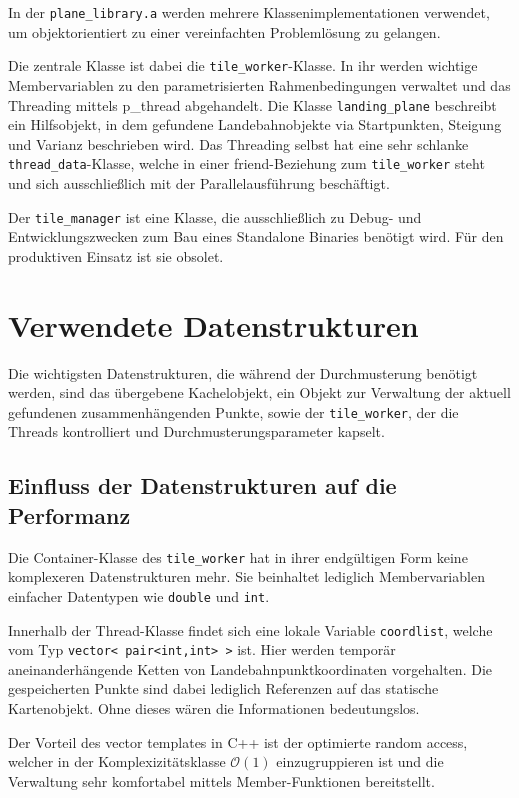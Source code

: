 \documentclass[10pt,a4paper]{report}
\begin{document}
In der \texttt{plane\_library.a} werden mehrere Klassenimplementationen verwendet, um objektorientiert zu einer vereinfachten Problemlösung zu gelangen.

Die zentrale Klasse ist dabei die \texttt{tile\_worker}-Klasse. In ihr werden wichtige Membervariablen zu den parametrisierten Rahmenbedingungen verwaltet und das Threading mittels p\_thread abgehandelt. Die Klasse \texttt{landing\_plane} beschreibt ein Hilfsobjekt, in dem gefundene Landebahnobjekte via Startpunkten, Steigung und Varianz beschrieben wird.
Das Threading selbst hat eine sehr schlanke \texttt{thread\_data}-Klasse, welche in einer \glqq friend\grqq -Beziehung zum \texttt{tile\_worker} steht und sich ausschließlich mit der Parallelausführung beschäftigt.

Der \texttt{tile\_manager} ist eine Klasse, die ausschließlich zu Debug- und Entwicklungszwecken zum Bau eines Standalone Binaries benötigt wird.
Für den produktiven Einsatz ist sie obsolet.


\section{Verwendete Datenstrukturen}

Die wichtigsten Datenstrukturen, die während der Durchmusterung benötigt werden, sind das übergebene Kachelobjekt, ein Objekt zur Verwaltung der aktuell gefundenen zusammenhängenden Punkte, sowie der \texttt{tile\_worker}, der die Threads kontrolliert und Durchmusterungsparameter kapselt. 

\subsection{Einfluss der Datenstrukturen auf die Performanz}

Die Container-Klasse des \texttt{tile\_worker} hat in ihrer endgültigen Form keine komplexeren Datenstrukturen mehr. Sie beinhaltet lediglich Membervariablen einfacher Datentypen wie \texttt{double} und \texttt{int}.

Innerhalb der Thread-Klasse findet sich eine lokale Variable \texttt{coordlist}, welche vom Typ \texttt{vector< pair<int,int> >} ist.
Hier werden temporär aneinanderhängende Ketten von Landebahnpunktkoordinaten vorgehalten. Die gespeicherten Punkte sind dabei lediglich Referenzen auf das statische Kartenobjekt. Ohne dieses wären die Informationen bedeutungslos.

Der Vorteil des vector templates in C++ ist der optimierte random access, welcher in der Komplexizitätsklasse $\mathcal O(1)$ einzugruppieren ist und die Verwaltung sehr komfortabel mittels Member-Funktionen bereitstellt.
\end{document}
